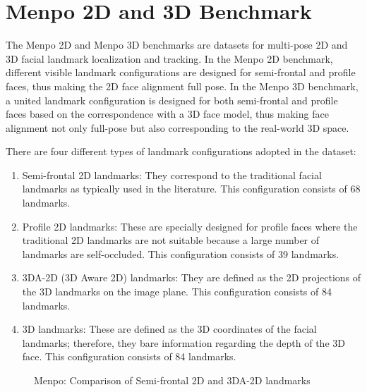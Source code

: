 \section{Menpo 2D and 3D Benchmark}
The Menpo 2D and Menpo 3D benchmarks \citep{menpo} are datasets for multi-pose 2D and 3D facial landmark localization and tracking. In the Menpo 2D benchmark, different visible landmark configurations are designed for semi-frontal and profile faces, thus making the 2D face alignment full pose. In the Menpo 3D benchmark, a united landmark configuration is designed for both semi-frontal and profile faces based on the correspondence with a 3D face model, thus making face alignment not only full-pose but also corresponding to the real-world 3D space.

There are four different types of landmark configurations adopted in the dataset:
\begin{enumerate}
    \item Semi-frontal 2D landmarks: They correspond to the traditional facial landmarks as typically used in the literature. This configuration consists of 68 landmarks.
    \item Profile 2D landmarks: These are specially designed for profile faces where the traditional 2D landmarks are not suitable because a large number of landmarks are self-occluded. This configuration consists of 39 landmarks.
    \item 3DA-2D (3D Aware 2D) landmarks: They are defined as the 2D projections of the 3D landmarks on the image plane. This configuration consists of 84 landmarks.
    \item 3D landmarks: These are defined as the 3D coordinates of the facial landmarks; therefore, they bare information regarding the depth of the 3D face. This configuration consists of 84 landmarks.
\end{enumerate}

\begin{figure}[h]
    \centering
    \captionsetup[subfigure]{justification=centering}
    \quad
    \caption[Menpo: Semi-frontal 2D and 3DA-2D landmarks]{Menpo: Comparison of Semi-frontal 2D and 3DA-2D landmarks}
\end{figure}

